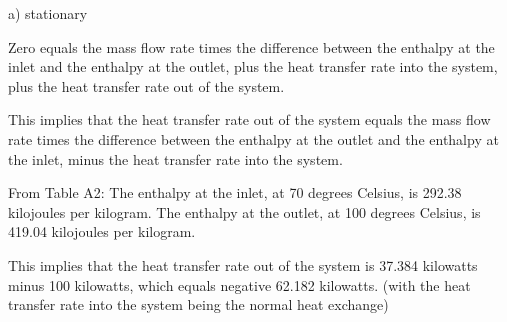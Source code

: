 a) stationary

Zero equals the mass flow rate times the difference between the enthalpy at the inlet and the enthalpy at the outlet, plus the heat transfer rate into the system, plus the heat transfer rate out of the system.

This implies that the heat transfer rate out of the system equals the mass flow rate times the difference between the enthalpy at the outlet and the enthalpy at the inlet, minus the heat transfer rate into the system.

From Table A2:
The enthalpy at the inlet, at 70 degrees Celsius, is 292.38 kilojoules per kilogram.
The enthalpy at the outlet, at 100 degrees Celsius, is 419.04 kilojoules per kilogram.

This implies that the heat transfer rate out of the system is 37.384 kilowatts minus 100 kilowatts, which equals negative 62.182 kilowatts.
(with the heat transfer rate into the system being the normal heat exchange)